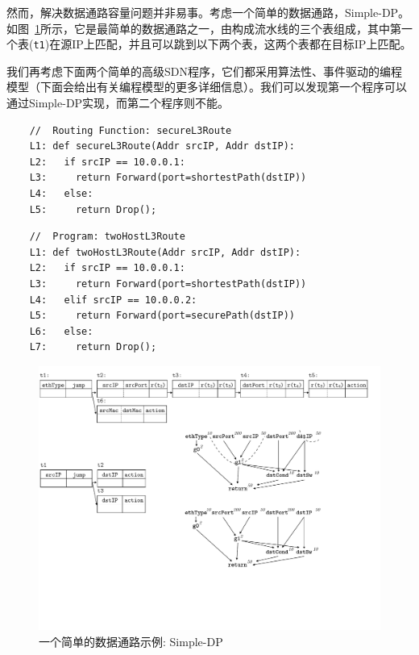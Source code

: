 然而，解决数据通路容量问题并非易事。考虑一个简单的数据通路，Simple-DP。如图~\ref{cap:fig:fig1-update}所示，它是最简单的数据通路之一，由构成流水线的三个表组成，其中第一个表(\texttt{t1})在源IP上匹配，并且可以跳到以下两个表，这两个表都在目标IP上匹配。

我们再考虑下面两个简单的高级SDN程序，它们都采用算法性、事件驱动的编程模型（下面会给出有关编程模型的更多详细信息）。我们可以发现第一个程序可以通过Simple-DP实现，而第二个程序则不能。

{\small
    \begin{verbatim}
    //  Routing Function: secureL3Route
    L1: def secureL3Route(Addr srcIP, Addr dstIP):
    L2:   if srcIP == 10.0.0.1:
    L3:     return Forward(port=shortestPath(dstIP))
    L4:   else:
    L5:     return Drop();
    \end{verbatim}
}

{\small
    \begin{verbatim}
    //  Program: twoHostL3Route
    L1: def twoHostL3Route(Addr srcIP, Addr dstIP):
    L2:   if srcIP == 10.0.0.1:
    L3:     return Forward(port=shortestPath(dstIP)) 
    L4:   elif srcIP == 10.0.0.2:
    L5:     return Forward(port=securePath(dstIP))
    L6:   else:
    L7:     return Drop();
    \end{verbatim}
}



\begin{figure}[h!]
    \centering
    \includegraphics[scale = 0.9]{figures/figure1.pdf}
    \caption{一个简单的数据通路示例: Simple-DP}
    \label{cap:fig:fig1-update}
\end{figure}

